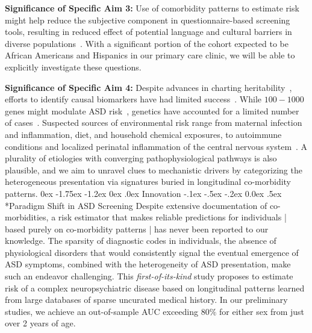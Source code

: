 \documentclass[onecolumn, compsoc,11pt]{IEEEtran}
\makeatletter
\renewcommand\subsection{\@startsection {subsection}{2}{\z@}%
                                   {0ex \@plus -1.75ex \@minus -1.2ex}%
                                   {0ex \@plus.0ex}%
                                   {\fontsize{11}{11}\selectfont\bfseries\sffamily\color{black}}}
\renewcommand\paragraph{\@startsection {section}{1}{\z@}%
                                   {-.1ex \@plus -.5ex \@minus -.2ex}%
                                   {0.0ex \@plus.5ex}%
                                   {\fontsize{11}{10}\selectfont\bfseries\itshape\sffamily\color{black}}}
\makeatother
\begin{document}
\textbf{Significance of Specific Aim 3:} Use of comorbidity patterns to estimate risk might help reduce the subjective component in questionnaire-based screening tools, resulting in reduced effect of potential language and cultural barriers in diverse populations~\cite{hyman2020identification}. With a significant portion of the  cohort expected to be African Americans and Hispanics in our primary care clinic, we  will be able to explicitly investigate these questions.

\textbf{Significance of Specific Aim 4:} 
Despite   advances in charting  heritability~\cite{Satterstrom484113,sandin17},
efforts to  identify  causal biomarkers  have had limited success~\cite{pmid29691724,pmid29307081}. While   $100-1000$ genes might modulate ASD risk~\cite{pmid26402605,pmid25038753,Satterstrom484113,pmid27891212},   genetics have accounted for a limited number of cases~\cite{pmid18414403}. Suspected sources of environmental  risk  range from maternal infection and inflammation, diet, and  household chemical exposures,  to autoimmune conditions and localized perinatal  inflammation of the central nervous system~\cite{pmid30971960,pmid30941018,pmid29691724,pmid29307081,pmid27351598,pmid26793298,pmid30095240,pmid25681541}. A plurality of   etiologies with converging pathophysiological pathways is also plausible, and we  aim to unravel clues to mechanistic drivers by  categorizing the heterogeneous presentation via signatures buried in longitudinal co-morbidity patterns.
 \subsection{Innovation}
\paragraph*{Paradigm Shift in ASD Screening} Despite extensive documentation of co-morbidities,   a risk estimator that makes reliable predictions for  individuals | based purely on co-morbidity patterns |  has never been reported to  our knowledge. The sparsity of  diagnostic codes in individuals,  the  absence of physiological disorders  that would consistently signal the eventual emergence of ASD symptoms, combined with the heterogeneity of ASD presentation,  make such an endeavor challenging. This \textit{first-of-its-kind}  study proposes to estimate  risk  of a complex neuropsychiatric disease based on longitudinal patterns learned from   large databases of sparse uncurated  medical history. In our preliminary studies, we achieve an out-of-sample AUC exceeding  $80\%$ for  either sex from just over 2 years of age. 
\end{document}
